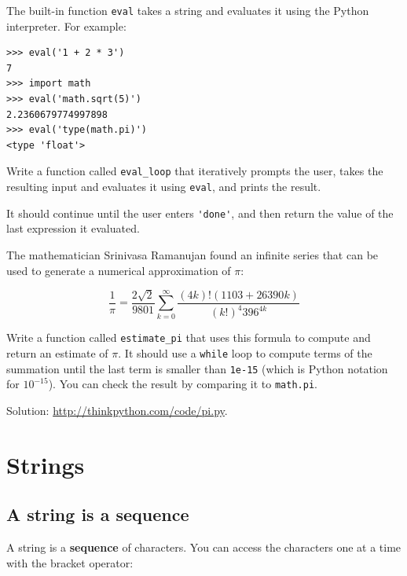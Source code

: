 \documentclass[10pt]{book}
\begin{document}
\begin{CJK}{UTF8}{gbsn}
\begin{exercise}

The built-in function {\tt eval} takes a string and evaluates
it using the Python interpreter.  For example:

\begin{verbatim}
>>> eval('1 + 2 * 3')
7
>>> import math
>>> eval('math.sqrt(5)')
2.2360679774997898
>>> eval('type(math.pi)')
<type 'float'>
\end{verbatim}
%
Write a function called \verb"eval_loop" that iteratively
prompts the user, takes the resulting input and evaluates
it using {\tt eval}, and prints the result.

It should continue until the user enters \verb"'done'", and then
return the value of the last expression it evaluated.

\end{exercise}


\begin{exercise}

The mathematician Srinivasa Ramanujan found an
infinite series
that can be used to generate a numerical
approximation of $\pi$:

\[ \frac{1}{\pi} = \frac{2\sqrt{2}}{9801} 
\sum^\infty_{k=0} \frac{(4k)!(1103+26390k)}{(k!)^4 396^{4k}} \]

Write a function called \verb"estimate_pi" that uses this formula
to compute and return an estimate of $\pi$.  It should use a {\tt while}
loop to compute terms of the summation until the last term is
smaller than {\tt 1e-15} (which is Python notation for $10^{-15}$).
You can check the result by comparing it to {\tt math.pi}.

Solution: \url{http://thinkpython.com/code/pi.py}.

\end{exercise}


\chapter{Strings}
\label{strings}


\section{A string is a sequence}

A string is a {\bf sequence} of characters.  
You can access the characters one at a time with the
bracket operator:


\end{CJK}
\end{document}
